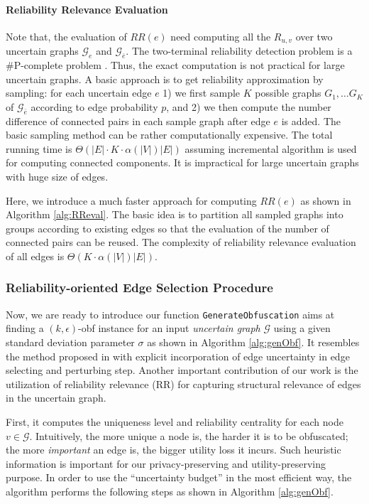 \paragraph{Reliability Relevance Evaluation}

Note that, the evaluation of $RR(e)$ need computing all the $R_{u,v}$ over two uncertain graphs $\mathcal{G}_{e}$ and $\mathcal{G}_{\bar{e}}$.  The two-terminal reliability detection problem is a $\#$P-complete problem \cite{MOBall}. Thus, the exact computation is not practical for large uncertain graphs. A basic approach is to get reliability approximation by sampling: for each uncertain edge $e$ 1) we first sample $K$ possible graphs $G_{1}, \ldots G_{K}$ of $\mathcal{G}_{\bar{e}}$ according to edge probability $\mathit{p}$, and 2) we then compute the number difference of connected pairs in each sample graph after edge $e$ is added. The basic sampling method can be rather computationally expensive. The total running time is $\Theta(|E| \cdot K\cdot \alpha(|V|) |E|)$ assuming incremental algorithm is used for computing connected components. It is impractical for large uncertain graphs with huge size of edges. 

Here, we introduce a much faster approach for computing $RR(e)$ as shown in Algorithm \ref{alg:RReval}. The basic idea is to partition all sampled graphs into groups according to existing edges so that the evaluation of the number of connected pairs can be reused. 
The complexity of reliability relevance evaluation of all edges is  $\Theta(K \cdot \alpha(|V|) |E|)$. 

\subsubsection{Reliability-oriented Edge Selection Procedure}


Now, we are ready to introduce our function \texttt{GenerateObfuscation} aims at finding a $(k,\epsilon)$-obf instance for an input \emph{uncertain graph} $\mathcal{G}$ using a given standard deviation parameter $\sigma$ as shown in Algorithm \ref{alg:genObf}. It resembles the method proposed in \cite{Boldi_Injecting_2012} with explicit incorporation of edge uncertainty in edge selecting and perturbing step. Another important contribution of our work is the utilization of reliability relevance (RR) for capturing structural relevance of edges in the uncertain graph.  

First, it computes the uniqueness level and reliability centrality for each node $v \in \mathcal{G}$. Intuitively, the more unique a node is, the harder it is to be obfuscated; the more \emph{important} an edge is, the bigger utility loss it incurs. Such heuristic information is important for our privacy-preserving and utility-preserving purpose. In order to  use the ``uncertainty budget'' in the most efficient way, the algorithm performs the following steps as shown in Algorithm \ref{alg:genObf}.

